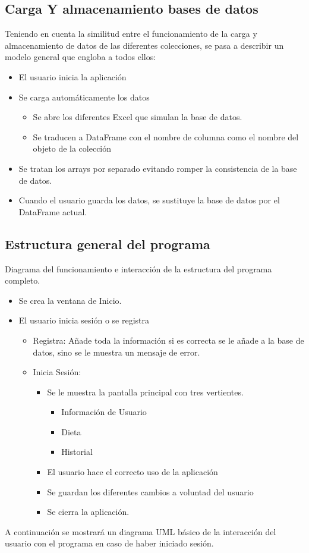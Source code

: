 \subsection{Carga Y almacenamiento bases de datos}
Teniendo en cuenta la similitud entre el funcionamiento de la carga y almacenamiento de datos de las diferentes colecciones, se pasa a describir un modelo general que engloba a todos ellos:
\begin{itemize}
\item El usuario inicia la aplicación
\item Se carga automáticamente los datos
\begin{itemize}
\item Se abre los diferentes Excel que simulan la base de datos.
\item Se traducen a DataFrame con el nombre de columna como el nombre del objeto de la colección
\end{itemize}
\item Se tratan los arrays por separado evitando romper la consistencia de la base de datos.
\item Cuando el usuario guarda los datos, se sustituye la base de datos por el DataFrame actual.
\end{itemize}
\subsection{Estructura general del programa}
Diagrama del funcionamiento e interacción de la estructura del programa completo.
\begin{itemize}
\item Se crea la ventana de Inicio.
\item El usuario inicia sesión o se registra
\begin{itemize}
\item Registra: Añade toda la información si es correcta se le añade a la base de datos, sino se le muestra un mensaje de error.
\item Inicia Sesión:
\begin{itemize}
\item Se le muestra la pantalla principal con tres vertientes.
\begin{itemize}
\item Información de Usuario
\item Dieta
\item Historial
\end{itemize}
\item El usuario hace el correcto uso de la aplicación
\item Se guardan los diferentes cambios a voluntad del usuario
\item Se cierra la aplicación.
\end{itemize}
\end{itemize}
\end{itemize}
A continuación se mostrará un diagrama UML básico de la interacción del usuario con el programa en caso de haber iniciado sesión.
